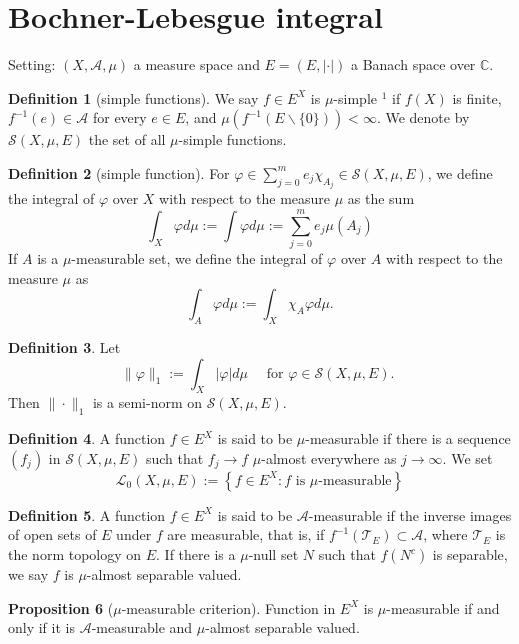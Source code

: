 \documentclass[12pt,a4paper]{book}
\newcommand{\bb}[1]{\mathbb{#1}}
\theoremstyle{definition}
\newtheorem{defn}{Definition}[section]
\newtheorem{prop}[defn]{Proposition}
\begin{document}
\section{Bochner-Lebesgue integral}
Setting: $(X, \mathcal{A},\mu)$ a measure space
and $E=(E,|\cdot|)$ a Banach space over $\bb{C}$.
\begin{defn}[simple functions]
    We say $f \in E^X$ is $\mu$-simple ${ }^1$ if $f(X)$ is finite, $f^{-1}(e) \in \mathcal{A}$ for every $e \in E$, and $\mu\left(f^{-1}(E \backslash\{0\})\right)<\infty$. We denote by $\mathcal{S}(X, \mu, E)$ the set of all $\mu$-simple functions.
 
\end{defn}
\begin{defn}[simple function]
    For $\varphi \in \sum_{j=0}^m e_j \chi_{A_j} \in \mathcal{S}(X, \mu, E)$, we define the integral of $\varphi$ over $X$ with respect to the measure $\mu$ as the sum
    $$
    \int_X \varphi d \mu:=\int \varphi d \mu:=\sum_{j=0}^m e_j \mu\left(A_j\right)
    $$
    If $A$ is a $\mu$-measurable set, we define the integral of $\varphi$ over $A$ with respect to the measure $\mu$ as
    $$
    \int_A \varphi d \mu:=\int_X \chi_A \varphi d \mu .
    $$
\end{defn}
\begin{defn}
    Let
    $$
    \|\varphi\|_1:=\int_X|\varphi| d \mu \quad \text { for } \varphi \in \mathcal{S}(X, \mu, E) \text {. }
    $$
    Then $\|\cdot\|_1$ is a semi-norm on $\mathcal{S}(X, \mu, E)$.
\end{defn}
\begin{defn}
    A function $f \in E^X$ is said to be $\mu$-measurable if there is a sequence $\left(f_j\right)$ in $\mathcal{S}(X, \mu, E)$ such that $f_j \rightarrow f$ $\mu$-almost everywhere as $j \rightarrow \infty$. We set 
    $$
    \mathcal{L}_0(X, \mu, E):=\left\{f \in E^X:f \text{ is $\mu$-measurable} \right\}
    $$
\end{defn}

\begin{defn}
    A function $f \in E^X$ is said to be $\mathcal{A}$-measurable if the inverse images of open sets of $E$ under $f$ are measurable, that is, if $f^{-1}\left(\mathcal{T}_E\right) \subset \mathcal{A}$, where $\mathcal{T}_E$ is the norm topology on $E$. 
    If there is a $\mu$-null set $N$ such that $f\left(N^c\right)$ is separable, we say $f$ is $\mu$-almost separable valued.
\end{defn}

\begin{prop}[$\mu$-measurable criterion]
    Function in $E^X$ is $\mu$-measurable if and only if it is $\mathcal{A}$-measurable and $\mu$-almost separable valued.
    \label{proposition: mu-measurable criterion}
\end{prop}
\end{document}
